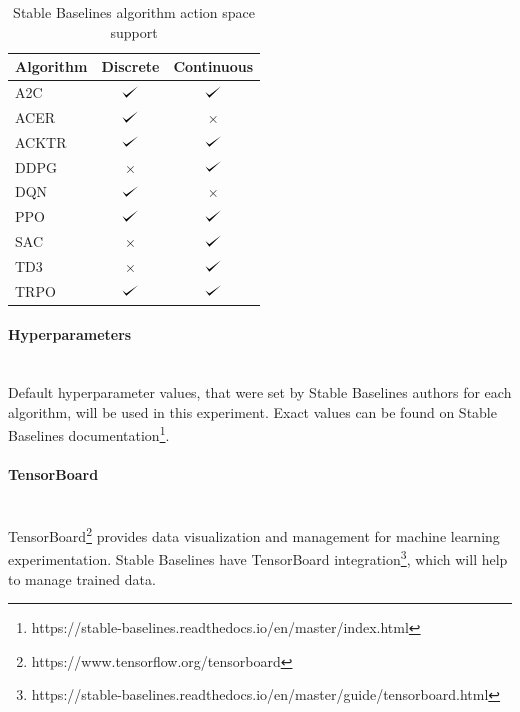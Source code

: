 \documentclass[12pt, a4paper]{article}
\def\checkmark{\tikz\fill[scale=0.4](0,.35) -- (.25,0) -- (1,.7) -- (.25,.15) -- cycle;}
\begin{document}
\begin{table}[H]
\centering
\begin{tabular}{|l|c|c|} 
\hline
Algorithm & \multicolumn{1}{l|}{Discrete} & \multicolumn{1}{l|}{Continuous}  \\ 
\hline
A2C       & $\checkmark$                    & $\checkmark$                        \\
ACER      & $\checkmark$                    & $\times$                            \\
ACKTR     & $\checkmark$                    & $\checkmark$                        \\
DDPG      & $\times$                        & $\checkmark$                        \\
DQN       & $\checkmark$                    & $\times$                            \\
PPO       & $\checkmark$                    & $\checkmark$                        \\
SAC       & $\times$                        & $\checkmark$                        \\
TD3       & $\times$                        & $\checkmark$                        \\
TRPO      & $\checkmark$                    & $\checkmark$                        \\
\hline
\end{tabular}
\caption{Stable Baselines algorithm action space support}
\label{AlgorithmActionSpacesTable}
\end{table}

\paragraph{Hyperparameters}\mbox{}\\

Default hyperparameter values, that were set by Stable Baselines authors for each algorithm, will be used in this experiment. Exact values can be found on Stable Baselines documentation\footnote{https://stable-baselines.readthedocs.io/en/master/index.html}.

\paragraph{TensorBoard}\mbox{}\\

TensorBoard\footnote{https://www.tensorflow.org/tensorboard} provides data visualization and management for machine learning experimentation. Stable Baselines have TensorBoard integration\footnote{https://stable-baselines.readthedocs.io/en/master/guide/tensorboard.html}, which will help to manage trained data.
\end{document}
